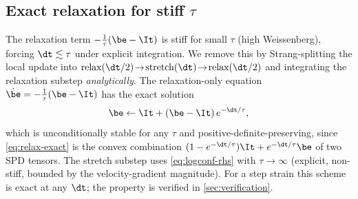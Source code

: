 \subsection{Exact relaxation for stiff \texorpdfstring{$\tau$}{tau}}
\label{sec:exact-relax}
The relaxation term $-\tfrac1\tau(\be-\It)$ is stiff for small $\tau$ (high
Weissenberg), forcing $\dt\lesssim\tau$ under explicit integration. We remove this by
Strang-splitting the local update into
$\text{relax}(\dt/2)\!\to\!\text{stretch}(\dt)\!\to\!\text{relax}(\dt/2)$ and
integrating the relaxation substep \emph{analytically}. The relaxation-only equation
$\dot{\be}=-\tfrac1\tau(\be-\It)$ has the exact solution
\begin{equation}
\be \leftarrow \It + (\be-\It)\,e^{-\dt/\tau},
\label{eq:relax-exact}
\end{equation}
which is unconditionally stable for any $\tau$ and positive-definite-preserving, since
\cref{eq:relax-exact} is the convex combination $(1-e^{-\dt/\tau})\It+e^{-\dt/\tau}\be$
of two SPD tensors. The stretch substep uses \cref{eq:logconf-rhs} with $\tau\to\infty$
(explicit, non-stiff, bounded by the velocity-gradient magnitude). For a step strain
this scheme is exact at any $\dt$; the property is verified in \cref{sec:verification}.
